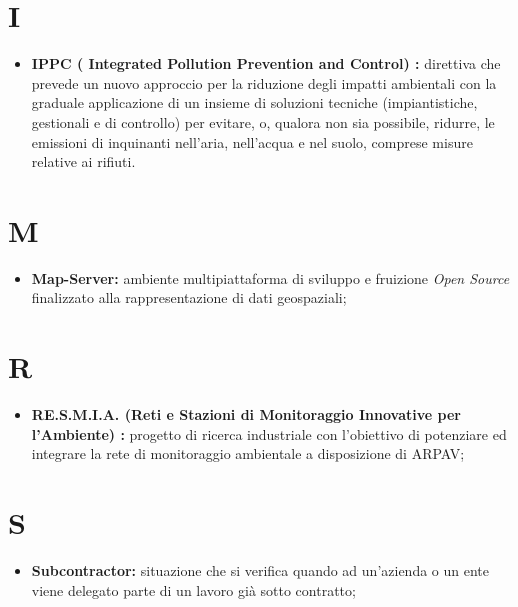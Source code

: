 \documentclass[11pt]{book}              %
\begin{document}
\section*{I}
\begin{itemize}

	\item \textbf{{\color{OliveGreen}IPPC} ( Integrated Pollution Prevention and Control) :}  direttiva che prevede un nuovo approccio per la riduzione degli impatti ambientali con la graduale applicazione di un insieme di soluzioni tecniche (impiantistiche, gestionali e di controllo) per evitare, o, qualora non sia possibile, ridurre, le emissioni di inquinanti nell'aria, nell'acqua e nel suolo, comprese misure relative ai rifiuti.

\end{itemize}

\section*{M}
\begin{itemize}
	\item \textbf{{\color{Plum} Map-Server}:} ambiente multipiattaforma di sviluppo e fruizione \textit{Open Source} finalizzato alla rappresentazione di dati geospaziali;
\end{itemize}

\section*{R}
\begin{itemize}

\item \textbf{{\color{OliveGreen}RE.S.M.I.A.} (Reti e Stazioni di Monitoraggio Innovative per l'Ambiente) :}
progetto di ricerca industriale con l'obiettivo di potenziare ed integrare la rete di monitoraggio ambientale a disposizione di ARPAV;

\end{itemize}

\section*{S}

\begin{itemize}

	\item \textbf{{\color{Plum} Subcontractor}:} situazione che si verifica quando ad un'azienda o un ente viene delegato parte di un lavoro già sotto contratto;

\end{itemize}
\end{document}
